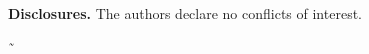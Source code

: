 \documentclass[9pt,twocolumn,twoside,pdftex]{optica}
\begin{document}
\medskip

\noindent\textbf{Disclosures.} The authors declare no conflicts of interest.









˜
\end{document}
